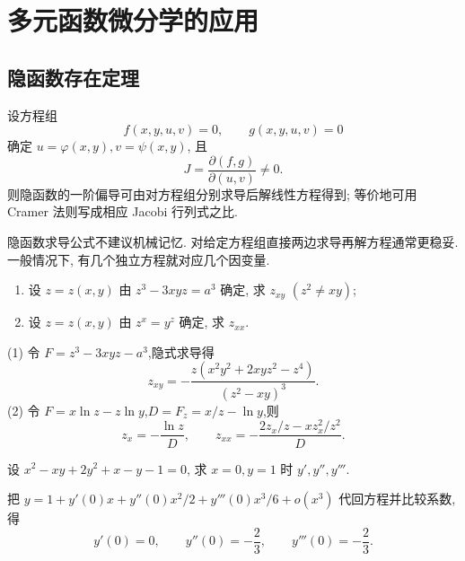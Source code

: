 \newpage

\section{多元函数微分学的应用}


\subsection{隐函数存在定理}

\begin{theorem}[\markstar]
    设方程组
    \[
        f(x,y,u,v)=0,\qquad g(x,y,u,v)=0
    \]
    确定 $u=\varphi(x,y),v=\psi(x,y)$, 且
    \[
        J=\dfrac{\partial(f,g)}{\partial(u,v)}\ne0.
    \]
    则隐函数的一阶偏导可由对方程组分别求导后解线性方程得到; 等价地可用 Cramer 法则写成相应 Jacobi 行列式之比.
\end{theorem}

\begin{remark}
    隐函数求导公式不建议机械记忆. 对给定方程组直接两边求导再解方程通常更稳妥. 一般情况下, 有几个独立方程就对应几个因变量.
\end{remark}




\begin{example}
    \begin{enumerate}
        \item 设 $z=z(x,y)$ 由 $z^3-3xyz=a^3$ 确定, 求 $z_{xy}$ $(z^2\ne xy)$;
        \item 设 $z=z(x,y)$ 由 $z^x=y^z$ 确定, 求 $z_{xx}$.
    \end{enumerate}
\end{example}
\exampleblank

\begin{solution}

    (1) 令 $F=z^3-3xyz-a^3$,隐式求导得
    \[
        z_{xy}=-\dfrac{z(x^2y^2+2xyz^2-z^4)}{(z^2-xy)^3}.
    \]
    (2) 令 $F=x\ln z-z\ln y$,$D=F_z=x/z-\ln y$,则
    \[
        z_x=-\dfrac{\ln z}{D},\qquad
        z_{xx}=-\dfrac{2z_x/z-xz_x^2/z^2}{D}.
    \]
\end{solution}

\begin{example}
    设 $x^2-xy+2y^2+x-y-1=0$, 求 $x=0,y=1$ 时 $y',y'',y'''$.
\end{example}
\exampleblank

\begin{solution}
    把 $y=1+y'(0)x+y''(0)x^2/2+y'''(0)x^3/6+o(x^3)$ 代回方程并比较系数,得
    \[
        y'(0)=0,\qquad y''(0)=-\dfrac{2}{3},\qquad y'''(0)=-\dfrac{2}{3}.
    \]
\end{solution}

